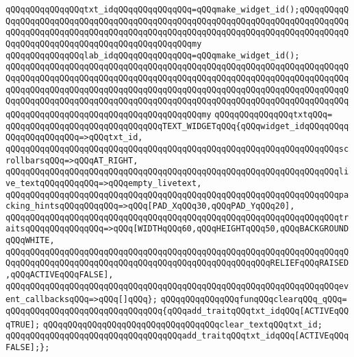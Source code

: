 \verb|qQQqqQQqqQQqqQQqtxt_idqQQqqQQqqQQqqQQq=qQQqmake_widget_id();qQQqqQQqqQQqqQQqqQQqqQQqqQQqqQQqqQQqqQQqqQQqqQQqqQQqqQQqqQQqqQQqqQQqqQQqqQQqqQQqqQQqqQQqqQQqqQQqqQQqqQQqqQQqqQQqqQQqqQQqqQQqqQQqqQQqqQQqqQQqqQQqqQQqqQQqqQQqqQQqqQQqqQQqqQQqqQQqqQQqqQQqqQQqmy|\newline
\verb|qQQqqQQqqQQqqQQqlab_idqQQqqQQqqQQqqQQq=qQQqmake_widget_id();|\newline
\verb|qQQqqQQqqQQqqQQqqQQqqQQqqQQqqQQqqQQqqQQqqQQqqQQqqQQqqQQqqQQqqQQqqQQqqQQqqQQqqQQqqQQqqQQqqQQqqQQqqQQqqQQqqQQqqQQqqQQqqQQqqQQqqQQqqQQqqQQqqQQqqQQqqQQqqQQqqQQqqQQqqQQqqQQqqQQqqQQqqQQqqQQqqQQqqQQqqQQqqQQqqQQqqQQqqQQqqQQqqQQqqQQqqQQqqQQqqQQqqQQqqQQqqQQqqQQqqQQqqQQqqQQqqQQqqQQqqQQqqQQqqQQqqQQqqQQqqQQqqQQqqQQqqQQqqQQqqQQqqQQqmy|\newline
\verb|qQQqqQQqqQQqqQQqtxtqQQq=|\newline
\verb|qQQqqQQqqQQqqQQqqQQqqQQqqQQqqQQqTEXT_WIDGETqQQq{qQQqwidget_idqQQqqQQqqQQqqQQqqQQqqQQq=>qQQqtxt_id,|\newline
\verb|qQQqqQQqqQQqqQQqqQQqqQQqqQQqqQQqqQQqqQQqqQQqqQQqqQQqqQQqqQQqqQQqqQQqscrollbarsqQQq=>qQQqAT_RIGHT,|\newline
\verb|qQQqqQQqqQQqqQQqqQQqqQQqqQQqqQQqqQQqqQQqqQQqqQQqqQQqqQQqqQQqqQQqqQQqlive_textqQQqqQQqqQQq=>qQQqempty_livetext,|\newline
\verb|qQQqqQQqqQQqqQQqqQQqqQQqqQQqqQQqqQQqqQQqqQQqqQQqqQQqqQQqqQQqqQQqqQQqpacking_hintsqQQqqQQqqQQq=>qQQq[PAD_XqQQq30,qQQqPAD_YqQQq20],|\newline
\verb|qQQqqQQqqQQqqQQqqQQqqQQqqQQqqQQqqQQqqQQqqQQqqQQqqQQqqQQqqQQqqQQqqQQqtraitsqQQqqQQqqQQqqQQq=>qQQq[WIDTHqQQq60,qQQqHEIGHTqQQq50,qQQqBACKGROUNDqQQqWHITE,|\newline
\verb|qQQqqQQqqQQqqQQqqQQqqQQqqQQqqQQqqQQqqQQqqQQqqQQqqQQqqQQqqQQqqQQqqQQqqQQqqQQqqQQqqQQqqQQqqQQqqQQqqQQqqQQqqQQqqQQqqQQqqQQqqQQqRELIEFqQQqRAISED,qQQqACTIVEqQQqFALSE],|\newline
\verb|qQQqqQQqqQQqqQQqqQQqqQQqqQQqqQQqqQQqqQQqqQQqqQQqqQQqqQQqqQQqqQQqqQQqevent_callbacksqQQq=>qQQq[]qQQq};|\newline
\newline
\verb|qQQqqQQqqQQqqQQqfunqQQqclearqQQq_qQQq=|\newline
\verb|qQQqqQQqqQQqqQQqqQQqqQQqqQQqqQQq{qQQqadd_traitqQQqtxt_idqQQq[ACTIVEqQQqTRUE];|\newline
\verb|qQQqqQQqqQQqqQQqqQQqqQQqqQQqqQQqqQQqclear_textqQQqtxt_id;|\newline
\verb|qQQqqQQqqQQqqQQqqQQqqQQqqQQqqQQqqQQqadd_traitqQQqtxt_idqQQq[ACTIVEqQQqFALSE];};|\newline
